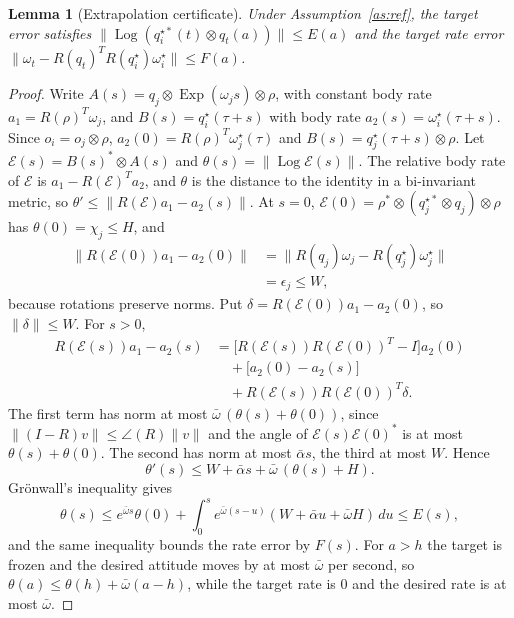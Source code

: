 \documentclass[journal]{IEEEtran}
\DeclareMathOperator{\Log}{Log}
\DeclareMathOperator{\Exp}{Exp}
\newtheorem{lemma}{Lemma}
\begin{document}
\begin{lemma}[Extrapolation certificate]\label{lem:ext}
Under Assumption~\ref{as:ref}, the target error satisfies $\|\Log(q_i^{\star*}(t)\otimes q_t(a))\|\le E(a)$ and the target rate error $\|\omega_t-R(q_t)^TR(q_i^\star)\omega_i^\star\|\le F(a)$.
\end{lemma}
\begin{proof}
Write $A(s)=q_j\otimes\Exp(\omega_js)\otimes\rho$, with constant body rate $a_1=R(\rho)^T\omega_j$, and $B(s)=q_i^\star(\tau+s)$ with body rate $a_2(s)=\omega_i^\star(\tau+s)$. Since $o_i=o_j\otimes\rho$, $a_2(0)=R(\rho)^T\omega_j^\star(\tau)$ and $B(s)=q_j^\star(\tau+s)\otimes\rho$. Let $\mathcal E(s)=B(s)^*\otimes A(s)$ and $\theta(s)=\|\Log\mathcal E(s)\|$. The relative body rate of $\mathcal E$ is $a_1-R(\mathcal E)^Ta_2$, and $\theta$ is the distance to the identity in a bi-invariant metric, so $\theta'\le\|R(\mathcal E)a_1-a_2(s)\|$. At $s=0$, $\mathcal E(0)=\rho^*\otimes(q_j^{\star*}\otimes q_j)\otimes\rho$ has $\theta(0)=\chi_j\le H$, and
\begin{equation}
\begin{aligned}\|R(\mathcal E(0))a_1-a_2(0)\|&=\|R(q_j)\omega_j-R(q_j^\star)\omega_j^\star\|\\&=\epsilon_j\le W,\end{aligned}
\end{equation}
because rotations preserve norms. Put $\delta=R(\mathcal E(0))a_1-a_2(0)$, so $\|\delta\|\le W$. For $s>0$,
\begin{equation}
\begin{aligned}R(\mathcal E(s))a_1-a_2(s)&=\big[R(\mathcal E(s))R(\mathcal E(0))^T-I\big]a_2(0)\\&\quad+\big[a_2(0)-a_2(s)\big]\\&\quad+R(\mathcal E(s))R(\mathcal E(0))^T\delta.\end{aligned}
\end{equation}
The first term has norm at most $\bar\omega\,(\theta(s)+\theta(0))$, since $\|(I-R)v\|\le\angle(R)\|v\|$ and the angle of $\mathcal E(s)\mathcal E(0)^*$ is at most $\theta(s)+\theta(0)$. The second has norm at most $\bar\alpha s$, the third at most $W$. Hence
\begin{equation}
\theta'(s)\le W+\bar\alpha s+\bar\omega\,(\theta(s)+H).
\end{equation}
Gr\"onwall's inequality gives
\begin{equation}
\theta(s)\le e^{\bar\omega s}\theta(0)+\!\int_0^s\!e^{\bar\omega(s-u)}(W+\bar\alpha u+\bar\omega H)\,du\le E(s),
\end{equation}
and the same inequality bounds the rate error by $F(s)$. For $a>h$ the target is frozen and the desired attitude moves by at most $\bar\omega$ per second, so $\theta(a)\le\theta(h)+\bar\omega(a-h)$, while the target rate is 0 and the desired rate is at most $\bar\omega$.
\end{proof}
\end{document}
